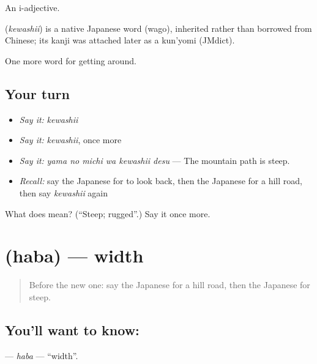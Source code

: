 An i-adjective.

\begin{cousinweb}
\textbf{} (\emph{kewashii}) is a native Japanese word (wago), inherited rather than borrowed from Chinese; its kanji was attached later as a kun'yomi (JMdict).
\end{cousinweb}

\begin{grammarlens}[title={What you've built}]
One more word for getting around.
\end{grammarlens}

\subsection*{Your turn}
\begin{itemize}
\raggedright
  \item \emph{Say it:} \emph{kewashii}
  \item \emph{Say it:} \emph{kewashii}, once more
  \item \emph{Say it:} \emph{yama no michi wa kewashii desu} — The mountain path is steep.
  \item \emph{Recall:} say the Japanese for to look back, then the Japanese for a hill road, then say \emph{kewashii} again
\end{itemize}

\begin{tcolorbox}[breakable,colback=teal!4,colframe=teal!35!black,title={Before you move on}]
What does  mean? (\textquotedblleft{}Steep; rugged\textquotedblright{}.) Say it once more.
\end{tcolorbox}
\section[\texorpdfstring{\ja{はば} (haba)}{はば (haba)}]{ (haba) — width}

\label{lesson:JA-C394-haba}



\begin{quote}
Before the new one: say the Japanese for a hill road, then the Japanese for steep.
\end{quote}

\subsection*{You'll want to know: }
\textbf{} — \emph{haba} — \textquotedblleft{}width\textquotedblright{}.

